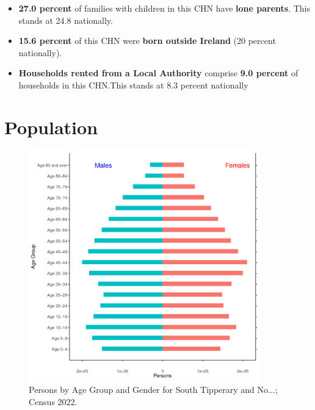 \documentclass{article}
\begin{document}
\begin{itemize}
\item \textbf{27.0 percent} of families with children in this CHN have \textbf{lone parents}. This stands at 24.8 nationally.

\item \textbf{15.6 percent} of this CHN were \textbf{born outside Ireland} (20 percent nationally).

\item \textbf{Households rented from a Local Authority} comprise \textbf{9.0 percent} of households in this CHN.This stands at 8.3 percent nationally

\end{itemize}

\pagebreak

\section{Population} 
\label{sect:Pop}

\begin{figure}[h]
	\centering
	\includegraphics[width = 100mm]{../figures/PyramidPlot.pdf}
	\caption{Persons by Age Group and Gender for South Tipperary and No...; Census 2022.}
	\label{fig:2ae19629-1a6a-13a3-e055-000000000001}
	\end{figure}
\end{document}
